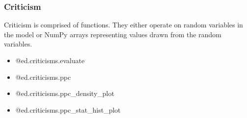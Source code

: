 \subsubsection{Criticism}

Criticism is comprised of functions. They either operate on random
variables in the model or NumPy arrays representing values drawn
from the random variables.

\begin{itemize}
  \item @{ed.criticisms.evaluate}
  \item @{ed.criticisms.ppc}
  \item @{ed.criticisms.ppc_density_plot}
  \item @{ed.criticisms.ppc_stat_hist_plot}
\end{itemize}
